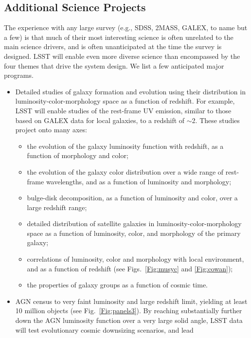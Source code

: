 \documentclass{emulateapj}
\begin{document}
\subsection{  Additional Science Projects}

The experience with any large survey (e.g., SDSS, 2MASS, GALEX, to name but a 
few) is that much of their most interesting science is often unrelated to 
the main science drivers, and is often unanticipated at the time the survey is 
designed. LSST will enable even more diverse science than encompassed by the 
four themes that drive the system design. We list a few anticipated major 
programs.

\begin{itemize}
\item Detailed studies of galaxy formation and evolution using their distribution in 
luminosity-color-morphology space as a function of redshift. For example, LSST will 
enable studies of the rest-frame UV emission, similar to those based on GALEX data 
for local galaxies, to a redshift of $\sim$2. These studies project onto many axes:
\begin{itemize}
  \item the evolution of the galaxy luminosity function with redshift, as a function of 
        morphology and color;
  \item the evolution of the galaxy color distribution over a wide range of rest-frame 
        wavelengths, and as a function of luminosity and morphology; 
  \item bulge-disk decomposition, as a function of luminosity and color, over 
        a large redshift range; 
  \item detailed distribution of satellite galaxies in luminosity-color-morphology space 
        as a function of luminosity, color, and morphology of the primary galaxy; 
  \item correlations of luminosity, color and morphology with local environment, and
        as a function of redshift (see  Figs.~\ref{Fig:musyc} and \ref{Fig:cowan});
  \item the properties of galaxy groups as a function of cosmic time.
\end{itemize}
\item AGN census to very faint luminosity and large redshift limit, yielding
      at least 10 million objects (see Fig.~\ref{Fig:panels3}). By reaching substantially further 
      down the AGN luminosity function over a very large solid angle, LSST data 
      will test evolutionary cosmic downsizing scenarios, and lead 

\end{itemize}
\end{document}
